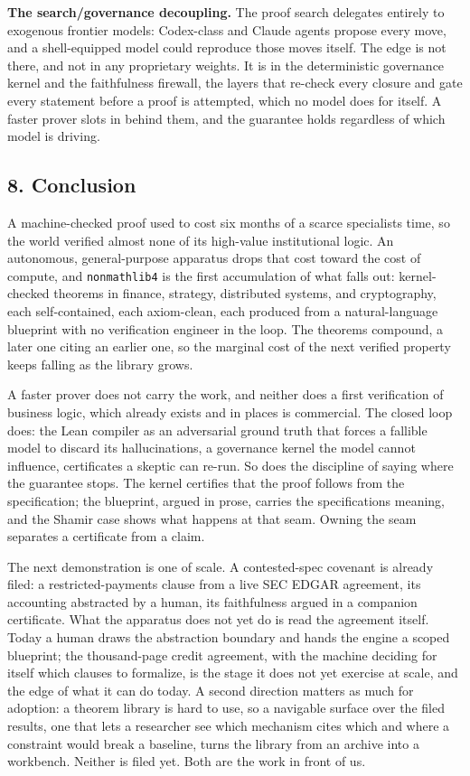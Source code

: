\documentclass[
  11pt,
]{article}
\renewcommand{\_}{\origunderscore\allowbreak}
\begin{document}
\textbf{The search/governance decoupling.} The proof search delegates
entirely to exogenous frontier models: Codex-class and Claude agents
propose every move, and a shell-equipped model could reproduce those
moves itself. The edge is not there, and not in any proprietary weights.
It is in the deterministic governance kernel and the faithfulness
firewall, the layers that re-check every closure and gate every
statement before a proof is attempted, which no model does for itself. A
faster prover slots in behind them, and the guarantee holds regardless
of which model is driving.

\subsection{8. Conclusion}\label{8-conclusion}

A machine-checked proof used to cost six months of a scarce
specialist\textquotesingle s time, so the world verified almost none of
its high-value institutional logic. An autonomous, general-purpose
apparatus drops that cost toward the cost of compute, and
\texttt{nonmathlib4} is the first accumulation of what falls out:
kernel-checked theorems in finance, strategy, distributed systems, and
cryptography, each self-contained, each axiom-clean, each produced from
a natural-language blueprint with no verification engineer in the loop.
The theorems compound, a later one citing an earlier one, so the
marginal cost of the next verified property keeps falling as the library
grows.

A faster prover does not carry the work, and neither does a first
verification of business logic, which already exists and in places is
commercial. The closed loop does: the Lean compiler as an adversarial
ground truth that forces a fallible model to discard its hallucinations,
a governance kernel the model cannot influence, certificates a skeptic
can re-run. So does the discipline of saying where the guarantee stops.
The kernel certifies that the proof follows from the specification; the
blueprint, argued in prose, carries the specification\textquotesingle s
meaning, and the Shamir case shows what happens at that seam. Owning the
seam separates a certificate from a claim.

The next demonstration is one of scale. A contested-spec covenant is
already filed: a restricted-payments clause from a live SEC EDGAR
agreement, its accounting abstracted by a human, its faithfulness argued
in a companion certificate. What the apparatus does not yet do is read
the agreement itself. Today a human draws the abstraction boundary and
hands the engine a scoped blueprint; the thousand-page credit agreement,
with the machine deciding for itself which clauses to formalize, is the
stage it does not yet exercise at scale, and the edge of what it can do
today. A second direction matters as much for adoption: a theorem
library is hard to use, so a navigable surface over the filed results,
one that lets a researcher see which mechanism cites which and where a
constraint would break a baseline, turns the library from an archive
into a workbench. Neither is filed yet. Both are the work in front of
us.
\end{document}
